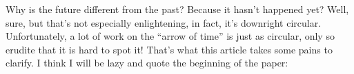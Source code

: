\documentclass[12pt]{article}
\def\tightlist{}
\renewcommand{\texttt}[1]{%
  \begingroup
  \ttfamily
  \begingroup\lccode`~=`/\lowercase{\endgroup\def~}{/\discretionary{}{}{}}%
  \begingroup\lccode`~=`[\lowercase{\endgroup\def~}{[\discretionary{}{}{}}%
  \begingroup\lccode`~=`.\lowercase{\endgroup\def~}{.\discretionary{}{}{}}%
  \catcode`/=\active\catcode`[=\active\catcode`.=\active
  \scantokens{#1\noexpand}%
  \endgroup
}
\begin{document}

Why is the future different from the past? Because it hasn't happened
yet? Well, sure, but that's not especially enlightening, in fact, it's
downright circular. Unfortunately, a lot of work on the ``arrow of
time'' is just as circular, only so erudite that it is hard to spot it!
That's what this article takes some pains to clarify. I think I will be
lazy and quote the beginning of the paper:
\end{document}
